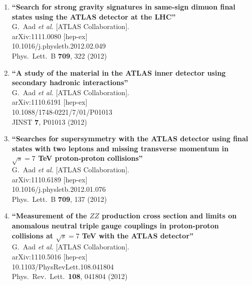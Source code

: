 \documentclass{article}
\begin{document}
\begin{enumerate}
\item%
{\bf ``Search for strong gravity signatures in same-sign dimuon final states using the ATLAS detector at the LHC''}
  \\{}G.~Aad {\it et al.}  [ATLAS Collaboration].
  \\{}arXiv:1111.0080 [hep-ex]
    \\{}10.1016/j.physletb.2012.02.049
\\{}Phys.\ Lett.\ B {\bf 709}, 322 (2012) %


\item%
{\bf ``A study of the material in the ATLAS inner detector using secondary hadronic interactions''}
  \\{}G.~Aad {\it et al.}  [ATLAS Collaboration].
  \\{}arXiv:1110.6191 [hep-ex]
    \\{}10.1088/1748-0221/7/01/P01013
\\{}JINST {\bf 7}, P01013 (2012) %


\item%
{\bf ``Searches for supersymmetry with the ATLAS detector using final states with two leptons and missing transverse momentum in $\sqrt{s}=7$ TeV proton-proton collisions''}
  \\{}G.~Aad {\it et al.}  [ATLAS Collaboration].
  \\{}arXiv:1110.6189 [hep-ex]
    \\{}10.1016/j.physletb.2012.01.076
\\{}Phys.\ Lett.\ B {\bf 709}, 137 (2012) %


\item%
{\bf ``Measurement of the $Z Z$ production cross section and limits on anomalous neutral triple gauge couplings in proton-proton collisions at $\sqrt{s}=7$ TeV with the ATLAS detector''}
  \\{}G.~Aad {\it et al.}  [ATLAS Collaboration].
  \\{}arXiv:1110.5016 [hep-ex]
    \\{}10.1103/PhysRevLett.108.041804
\\{}Phys.\ Rev.\ Lett.\  {\bf 108}, 041804 (2012) %



\end{enumerate}
\end{document}
